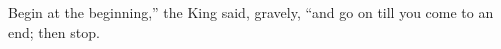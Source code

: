 
\begin{fquote}Begin at the beginning,'' the King said, gravely, ``and go on till you come to an end; then stop.
\end{fquote}
